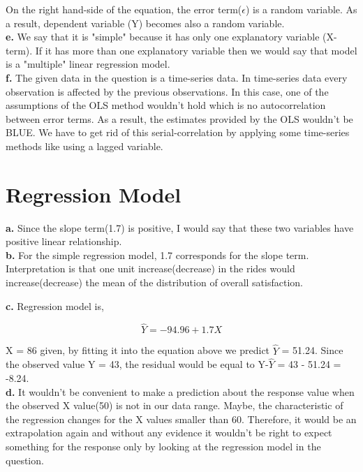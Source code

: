 \documentclass{article}
\begin{document}
On the right hand-side of the equation, the error term($\epsilon$) is a random variable. As a result, dependent variable (Y) becomes also a random variable.
\\

\textbf{e.} We say that it is "simple" because it has only one explanatory variable (X-term). If it has more than one explanatory variable then we would say that model is a "multiple" linear regression model. 
\\

\textbf{f.} The given data in the question is a time-series data. In time-series data every observation is affected by the previous observations. In this case, one of the assumptions of the OLS method wouldn't hold which is no autocorrelation between error terms. As a result, the estimates provided by the OLS wouldn't be BLUE. We have to get rid of this serial-correlation by applying some time-series methods like using a lagged variable.
\\

\section{Regression Model}

\textbf{a.} Since the slope term(1.7) is positive, I would say that these two variables have positive linear relationship.
\\

\textbf{b.} For the simple regression model, 1.7 corresponds for the slope term. Interpretation is that one unit increase(decrease) in the rides would increase(decrease) the mean of the distribution of overall satisfaction.
\\

\newpage

\textbf{c.} Regression model is,

\begin{equation}
\hat{Y} = -94.96 + 1.7X
\end{equation}

X = 86 given, by fitting it into the equation above we predict $\hat{Y}$ = 51.24. Since the observed value Y = 43, the residual would be equal to Y-$\hat{Y}$ = 43 - 51.24 = -8.24.
\\

\textbf{d.} It wouldn't be convenient to make a prediction about the response value when the observed X value(50) is not in our data range. Maybe, the characteristic of the regression changes for the X values smaller than 60. Therefore, it would be an extrapolation again and without any evidence it wouldn't be right to expect something for the response only by looking at the regression model in the question.
\end{document}
